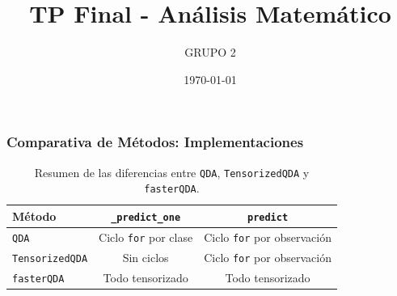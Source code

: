 \documentclass{beamer}
\title{TP Final - Análisis Matemático}
\author{GRUPO 2}
\date{\today}
\begin{document}


    
\begin{frame}
  \frametitle{Comparativa de Métodos: Implementaciones}

  \begin{table}[h!]
    \centering
    \begin{tabular}{@{}lcc@{}}
      \toprule
      \textbf{Método}       & \texttt{\_predict\_one}                    & \texttt{predict}                      \\ 
      \midrule
      \texttt{QDA}          & Ciclo \texttt{for} por clase              & Ciclo \texttt{for} por observación    \\ 
      \texttt{TensorizedQDA}& Sin ciclos                                & Ciclo \texttt{for} por observación    \\ 
      \texttt{fasterQDA}    & Todo tensorizado                          & Todo tensorizado                      \\ 
      \bottomrule
    \end{tabular}
    \caption{Resumen de las diferencias entre \texttt{QDA}, \texttt{TensorizedQDA} y \texttt{fasterQDA}.}
  \end{table}

\end{frame}
\end{document}

